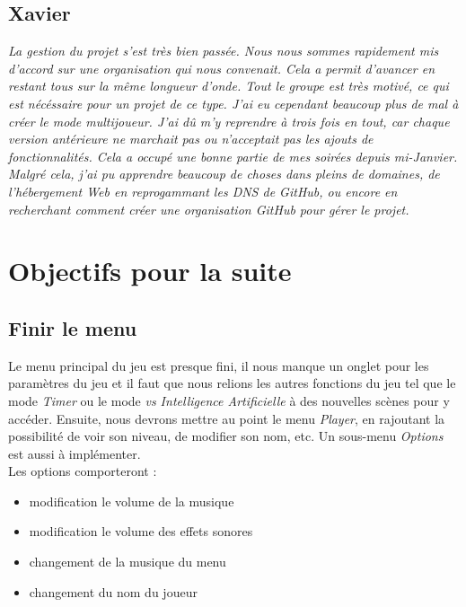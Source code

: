 \documentclass[12pt,a4paper]{article}
\newcommand{\AI}{Intelligence Artificielle}
\begin{document}
    \subsection{Xavier}
        \textit{La gestion du projet s'est très bien passée. Nous nous sommes
        rapidement mis d'accord sur une organisation qui nous convenait. Cela a
        permit d'avancer en restant tous sur la même longueur d'onde. Tout le
        groupe est très motivé, ce qui est nécéssaire pour un projet de ce type.
        J'ai eu cependant beaucoup plus de mal à créer le mode multijoueur. J'ai
        dû m'y reprendre à trois fois en tout, car chaque version antérieure
        ne marchait pas ou n'acceptait pas les ajouts de fonctionnalités. Cela a
        occupé une bonne partie de mes soirées depuis mi-Janvier. Malgré cela, 
        j'ai pu apprendre beaucoup de choses dans pleins de domaines, de
        l'hébergement Web en reprogammant les \textit{DNS} de \textsl{GitHub}, 
        ou encore en recherchant comment créer une organisation \textsl{GitHub} 
        pour gérer le projet.}

\clearpage

\section{Objectifs pour la suite}
    \subsection{Finir le menu}
        Le menu principal du jeu est presque fini, il nous manque un onglet 
        pour les paramètres du jeu et il faut que nous relions les autres
        fonctions du jeu tel que le mode \textit{Timer} ou le mode \textit{vs \AI}
        à des nouvelles scènes pour y accéder. Ensuite, nous devrons mettre 
        au point le menu \textit{Player}, en rajoutant la possibilité de 
        voir son niveau, de modifier son nom, etc. Un sous-menu \textit{Options}
        est aussi à implémenter.\\
        Les options comporteront :
        \begin{itemize}
            \item modification le volume de la musique
            \item modification le volume des effets sonores
            \item changement de la musique du menu
            \item changement du nom du joueur
        \end{itemize}
\end{document}
